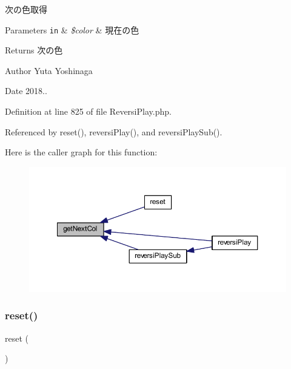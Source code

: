 次の色取得 


\begin{DoxyParams}[1]{Parameters}
\mbox{\tt in}  & {\em \$color} & 現在の色 \\
\hline
\end{DoxyParams}
\begin{DoxyReturn}{Returns}
次の色 
\end{DoxyReturn}
\begin{DoxyAuthor}{Author}
Yuta Yoshinaga 
\end{DoxyAuthor}
\begin{DoxyDate}{Date}
2018.. 
\end{DoxyDate}


Definition at line 825 of file Reversi\+Play.\+php.



Referenced by reset(), reversi\+Play(), and reversi\+Play\+Sub().

Here is the caller graph for this function\+:
\nopagebreak
\begin{figure}[H]
\begin{center}
\leavevmode
\includegraphics[width=350pt]{class_reversi_play_a26fd2d7723695b69cbfde7e16b55b096_icgraph}
\end{center}
\end{figure}
\mbox{\label{class_reversi_play_a4a20559544fdf4dcb457e258dc976cf8}} 
\subsubsection{\texorpdfstring{reset()}{reset()}}
{\footnotesize\ttfamily reset (\begin{DoxyParamCaption}{ }\end{DoxyParamCaption})}




